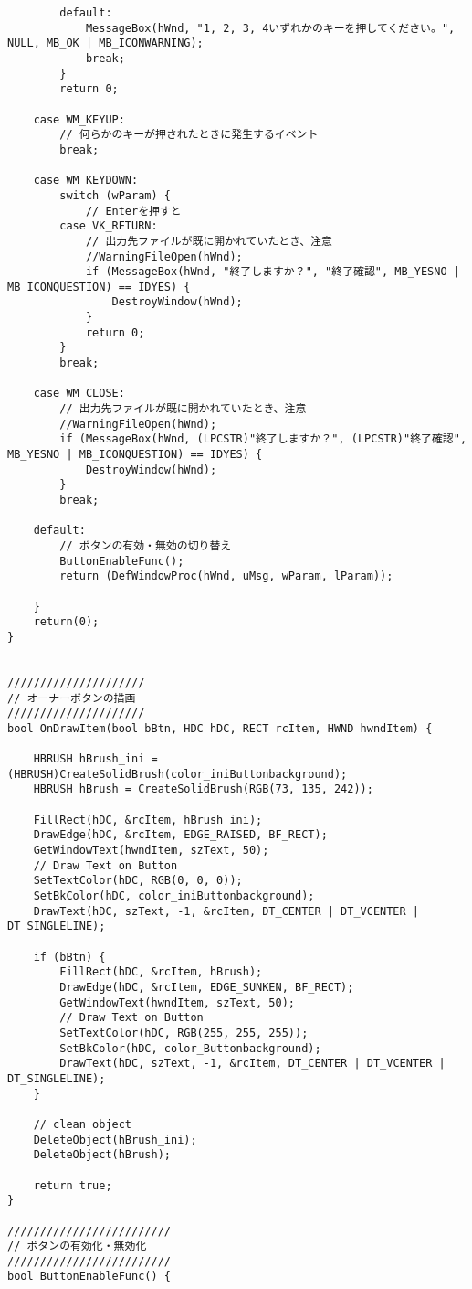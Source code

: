 \begin{verbatim}
		default:
			MessageBox(hWnd, "1, 2, 3, 4いずれかのキーを押してください。", NULL, MB_OK | MB_ICONWARNING);
			break;
		}
		return 0;

	case WM_KEYUP:
		// 何らかのキーが押されたときに発生するイベント
		break;

	case WM_KEYDOWN:
		switch (wParam) {
			// Enterを押すと
		case VK_RETURN:
			// 出力先ファイルが既に開かれていたとき、注意
			//WarningFileOpen(hWnd);
			if (MessageBox(hWnd, "終了しますか？", "終了確認", MB_YESNO | MB_ICONQUESTION) == IDYES) {
				DestroyWindow(hWnd);
			}
			return 0;
		}
		break;
 
	case WM_CLOSE:
		// 出力先ファイルが既に開かれていたとき、注意
		//WarningFileOpen(hWnd);
		if (MessageBox(hWnd, (LPCSTR)"終了しますか？", (LPCSTR)"終了確認", MB_YESNO | MB_ICONQUESTION) == IDYES) {
			DestroyWindow(hWnd);
		}
		break;

	default:
		// ボタンの有効・無効の切り替え
		ButtonEnableFunc();
		return (DefWindowProc(hWnd, uMsg, wParam, lParam));
	
	}
	return(0);  
}


/////////////////////
// オーナーボタンの描画
/////////////////////
bool OnDrawItem(bool bBtn, HDC hDC, RECT rcItem, HWND hwndItem) {

	HBRUSH hBrush_ini = (HBRUSH)CreateSolidBrush(color_iniButtonbackground);
	HBRUSH hBrush = CreateSolidBrush(RGB(73, 135, 242));

	FillRect(hDC, &rcItem, hBrush_ini);
	DrawEdge(hDC, &rcItem, EDGE_RAISED, BF_RECT);
	GetWindowText(hwndItem, szText, 50);
	// Draw Text on Button
	SetTextColor(hDC, RGB(0, 0, 0));
	SetBkColor(hDC, color_iniButtonbackground);
	DrawText(hDC, szText, -1, &rcItem, DT_CENTER | DT_VCENTER | DT_SINGLELINE);

	if (bBtn) {
		FillRect(hDC, &rcItem, hBrush);
		DrawEdge(hDC, &rcItem, EDGE_SUNKEN, BF_RECT);
		GetWindowText(hwndItem, szText, 50);
		// Draw Text on Button
		SetTextColor(hDC, RGB(255, 255, 255));
		SetBkColor(hDC, color_Buttonbackground);
		DrawText(hDC, szText, -1, &rcItem, DT_CENTER | DT_VCENTER | DT_SINGLELINE);
	}

	// clean object
	DeleteObject(hBrush_ini);
	DeleteObject(hBrush);

	return true;
}

/////////////////////////
// ボタンの有効化・無効化
/////////////////////////
bool ButtonEnableFunc() {


\end{verbatim}
